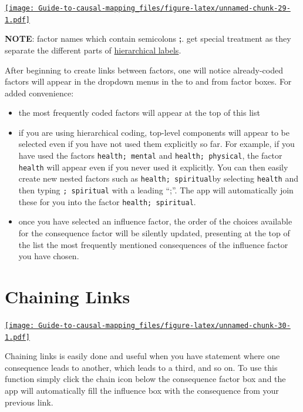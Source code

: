 \documentclass[
]{book}
\providecommand{\tightlist}{%
  \setlength{\itemsep}{0pt}\setlength{\parskip}{0pt}}
\begin{document}
\href{https://player.vimeo.com/video/588851236}{\texttt{[image: Guide-to-causal-mapping\_files/figure-latex/unnamed-chunk-29-1.pdf]}}

\textbf{NOTE}: factor names which contain semicolons \textbf{;}. get special treatment as they separate the different parts of \protect\hyperlink{xhierachical-coding}{hierarchical labels}.

After beginning to create links between factors, one will notice already-coded factors will appear in the dropdown menus in the to and from factor boxes. For added convenience:

\begin{itemize}
\tightlist
\item
  the most frequently coded factors will appear at the top of this list
\item
  if you are using hierarchical coding, top-level components will appear to be selected even if you have not used them explicitly so far. For example, if you have used the factors \texttt{health;\ mental} and \texttt{health;\ physical}, the factor \texttt{health} will appear even if you never used it explicitly. You can then easily create new nested factors such as \texttt{health;\ spiritual}by selecting \texttt{health} and then typing \texttt{;\ spiritual} with a leading ``;''. The app will automatically join these for you into the factor \texttt{health;\ spiritual}.
\item
  once you have selected an influence factor, the order of the choices available for the consequence factor will be silently updated, presenting at the top of the list the most frequently mentioned consequences of the influence factor you have chosen.
\end{itemize}

\hypertarget{xchaining-links}{%
\section{Chaining Links}\label{xchaining-links}}

\href{https://player.vimeo.com/video/588881701}{\texttt{[image: Guide-to-causal-mapping\_files/figure-latex/unnamed-chunk-30-1.pdf]}}

Chaining links is easily done and useful when you have statement where one consequence leads to another, which leads to a third, and so on. To use this function simply click the chain icon below the consequence factor box and the app will automatically fill the influence box with the consequence from your previous link.
\end{document}
